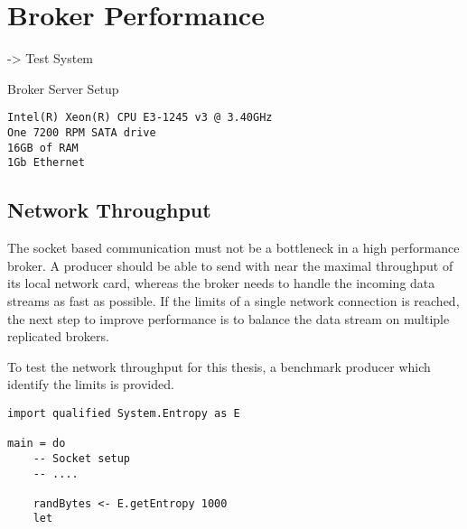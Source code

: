 
\section{Broker Performance}
-> Test System

Broker Server Setup
\begin{verbatim}
Intel(R) Xeon(R) CPU E3-1245 v3 @ 3.40GHz
One 7200 RPM SATA drive
16GB of RAM
1Gb Ethernet 
\end{verbatim}

\subsection{Network Throughput}
The socket based communication must not be a bottleneck in a high performance
broker. A producer should be able to send with near the maximal throughput of
its local network card, whereas the broker needs to handle the incoming data
streams as fast as possible. If the limits of a single network connection is
reached, the next step to improve performance is to balance the data
stream on multiple replicated brokers.

To test the network throughput for this thesis, a benchmark producer
which identify the limits is provided.

\begin{lstlisting}
import qualified System.Entropy as E

main = do 
    -- Socket setup 
    -- ....

    randBytes <- E.getEntropy 1000
    let
\end{lstlisting}


